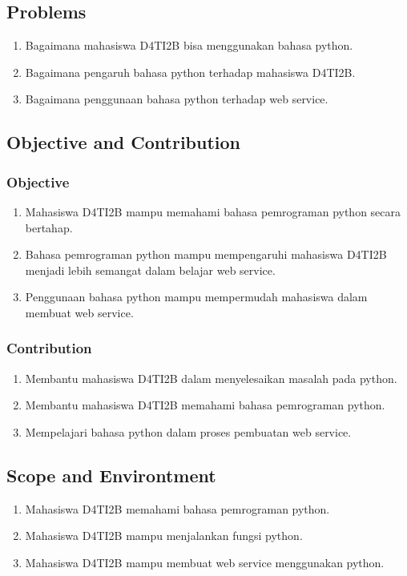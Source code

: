 \subsection{Problems}
	\begin{enumerate}
		\item Bagaimana mahasiswa D4TI2B bisa menggunakan bahasa python.
		\item Bagaimana pengaruh bahasa python terhadap mahasiswa D4TI2B.
		\item Bagaimana penggunaan bahasa python terhadap web service.
	\end{enumerate}
	
\subsection{Objective and Contribution}
	\subsubsection{Objective}
		\begin{enumerate}
			\item Mahasiswa D4TI2B mampu memahami bahasa pemrograman python secara bertahap.
			\item Bahasa pemrograman python mampu mempengaruhi mahasiswa D4TI2B menjadi lebih semangat dalam belajar web service.
			\item Penggunaan bahasa python mampu mempermudah mahasiswa dalam membuat web service.
		\end{enumerate}
	\subsubsection{Contribution}
		\begin{enumerate}
			\item Membantu mahasiswa D4TI2B dalam menyelesaikan masalah pada python.
			\item Membantu mahasiswa D4TI2B memahami bahasa pemrograman python.
			\item Mempelajari bahasa python dalam proses pembuatan web service.
		\end{enumerate}
		
\subsection{Scope and Environtment}
	\begin{enumerate}
		\item Mahasiswa D4TI2B memahami bahasa pemrograman python.
		\item Mahasiswa D4TI2B mampu menjalankan fungsi python.
		\item Mahasiswa D4TI2B mampu membuat web service menggunakan python.
	\end{enumerate}
